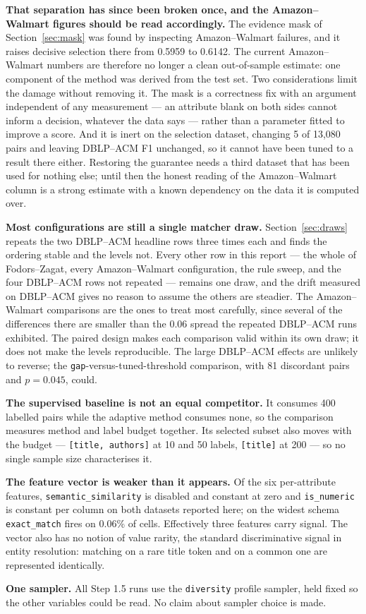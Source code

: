 \documentclass[11pt]{article}
\begin{document}
\textbf{That separation has since been broken once, and the Amazon--Walmart figures should
be read accordingly.} The evidence mask of Section~\ref{sec:mask} was found by inspecting
Amazon--Walmart failures, and it raises decisive selection there from 0.5959 to 0.6142. The
current Amazon--Walmart numbers are therefore no longer a clean out-of-sample estimate:
one component of the method was derived from the test set. Two considerations limit the
damage without removing it. The mask is a correctness fix with an argument independent of
any measurement --- an attribute blank on both sides cannot inform a decision, whatever the
data says --- rather than a parameter fitted to improve a score. And it is inert on the
selection dataset, changing 5 of 13{,}080 pairs and leaving DBLP--ACM F1 unchanged, so it
cannot have been tuned to a result there either. Restoring the guarantee needs a third
dataset that has been used for nothing else; until then the honest reading of the
Amazon--Walmart column is a strong estimate with a known dependency on the data it is
computed over.

\textbf{Most configurations are still a single matcher draw.} Section~\ref{sec:draws}
repeats the two DBLP--ACM headline rows three times each and finds the ordering stable and
the levels not. Every other row in this report --- the whole of Fodors--Zagat, every
Amazon--Walmart configuration, the rule sweep, and the four DBLP--ACM rows not repeated ---
remains one draw, and the drift measured on DBLP--ACM gives no reason to assume the others
are steadier. The Amazon--Walmart comparisons are the ones to treat most carefully, since
several of the differences there are smaller than the 0.06 spread the repeated DBLP--ACM
runs exhibited. The paired design makes each comparison valid within its own draw; it does
not make the levels reproducible. The large DBLP--ACM effects are unlikely to reverse; the
\texttt{gap}-versus-tuned-threshold comparison, with 81 discordant pairs and $p = 0.045$,
could.

\textbf{The supervised baseline is not an equal competitor.} It consumes 400 labelled pairs
while the adaptive method consumes none, so the comparison measures method and label budget
together. Its selected subset also moves with the budget --- \texttt{[title, authors]} at 10
and 50 labels, \texttt{[title]} at 200 --- so no single sample size characterises it.

\textbf{The feature vector is weaker than it appears.} Of the six per-attribute features,
\texttt{semantic\_similarity} is disabled and constant at zero and \texttt{is\_numeric} is
constant per column on both datasets reported here; on the widest schema
\texttt{exact\_match} fires on 0.06\% of cells. Effectively three features carry signal. The
vector also has no notion of value rarity, the standard discriminative signal in entity
resolution: matching on a rare title token and on a common one are represented identically.

\textbf{One sampler.} All Step 1.5 runs use the \texttt{diversity} profile sampler, held
fixed so the other variables could be read. No claim about sampler choice is made.
\end{document}
